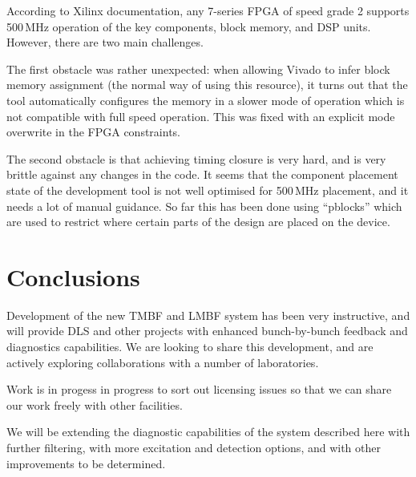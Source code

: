 \documentclass[
    a4paper,
    keeplastbox,            %
    hyphens,                %
]{jacow}
\begin{document}
According to Xilinx documentation, any 7-series FPGA of speed grade 2 supports
500\,MHz operation of the key components, block memory, and DSP units.  However,
there are two main challenges.

The first obstacle was rather unexpected: when allowing Vivado to infer block
memory assignment (the normal way of using this resource), it turns out that the
tool automatically configures the memory in a slower mode of operation which is
not compatible with full speed operation.  This was fixed with an explicit mode
overwrite in the FPGA constraints.

The second obstacle is that achieving timing closure is very hard, and is very
brittle against any changes in the code.  It seems that the component placement
state of the development tool is not well optimised for 500\,MHz placement, and
it needs a lot of manual guidance.  So far this has been done using ``pblocks''
which are used to restrict where certain parts of the design are placed on the
device.


\section{Conclusions}

Development of the new TMBF and LMBF system has been very instructive, and will
provide DLS and other projects with enhanced bunch-by-bunch feedback and
diagnostics capabilities.  We are looking to share this development, and are
actively exploring collaborations with a number of laboratories.

Work is in progess in progress to sort out licensing issues so that we can share
our work freely with other facilities.

We will be extending the diagnostic capabilities of the system described here
with further filtering, with more excitation and detection options, and with
other improvements to be determined.
\end{document}
